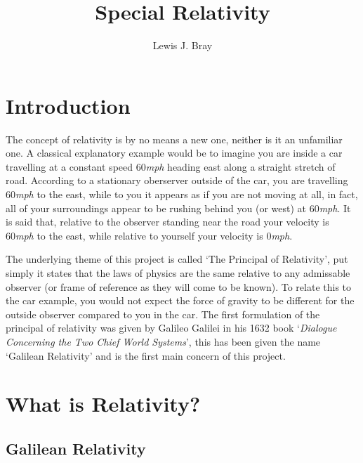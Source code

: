 \documentclass[a4paper,12pt,draft]{report}
\begin{document}
\title{Special Relativity}
\author{Lewis J. Bray}

\maketitle

\tableofcontents

\chapter{Introduction}

The concept of relativity is by no means a new one, neither is it an unfamiliar one. A classical explanatory example would be to imagine you are inside a car travelling at a constant speed 60\emph{mph} heading east along a straight stretch of road. According to a stationary oberserver outside of the car, you are travelling 60\emph{mph} to the east, while to you it appears as if you are not moving at all, in fact, all of your surroundings appear to be rushing behind you (or west) at 60\emph{mph}. It is said that, relative to the observer standing near the road your velocity is 60\emph{mph} to the east, while relative to yourself your velocity is 0\emph{mph}.

The underlying theme of this project is called `The Principal of Relativity', put simply it states that the laws of physics are the same relative to any admissable observer (or frame of reference as they will come to be known). To relate this to the car example, you would not expect the force of gravity to be different for the outside observer compared to you in the car. The first formulation of the principal of relativity was given by Galileo Galilei in his 1632 book `\emph{Dialogue Concerning the Two Chief World Systems}', this has been given the name `Galilean Relativity' and is the first main concern of this project.


\chapter{What is Relativity?}

\section{Galilean Relativity}
\end{document}

